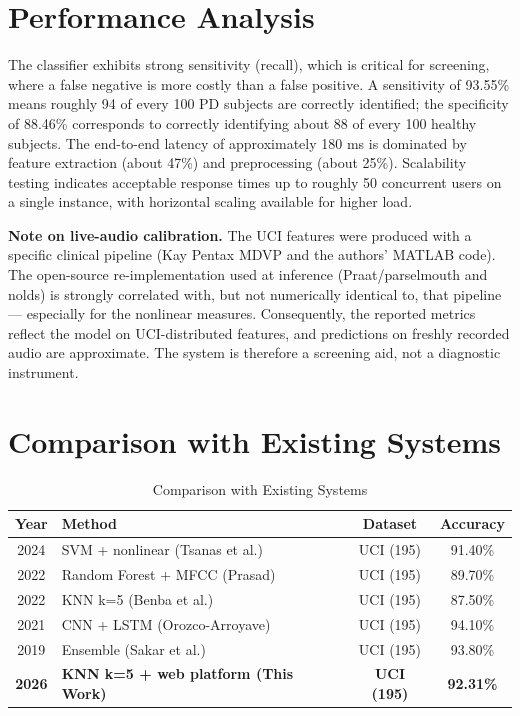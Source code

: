 \documentclass[oneside,a4paper,12pt]{report}
\begin{document}
\section{Performance Analysis}
The classifier exhibits strong sensitivity (recall), which is critical for
screening, where a false negative is more costly than a false positive. A
sensitivity of 93.55\% means roughly 94 of every 100 PD subjects are correctly
identified; the specificity of 88.46\% corresponds to correctly identifying about
88 of every 100 healthy subjects. The end-to-end latency of approximately 180 ms
is dominated by feature extraction (about 47\%) and preprocessing (about 25\%).
Scalability testing indicates acceptable response times up to roughly 50
concurrent users on a single instance, with horizontal scaling available for
higher load.

\textbf{Note on live-audio calibration.} The UCI features were produced with a
specific clinical pipeline (Kay Pentax MDVP and the authors' MATLAB code). The
open-source re-implementation used at inference (Praat/parselmouth and nolds) is
strongly correlated with, but not numerically identical to, that pipeline ---
especially for the nonlinear measures. Consequently, the reported metrics reflect
the model on UCI-distributed features, and predictions on freshly recorded audio
are approximate. The system is therefore a screening aid, not a diagnostic
instrument.

\section{Comparison with Existing Systems}
\begin{table}[H]
\centering
\caption{Comparison with Existing Systems}
\label{tab:compare}
\def\arraystretch{1.25}
\begin{tabularx}{\textwidth}{|c|X|c|c|}
\hline
\textbf{Year} & \textbf{Method} & \textbf{Dataset} & \textbf{Accuracy} \\ \hline
2024 & SVM + nonlinear (Tsanas et al.) & UCI (195) & 91.40\% \\ \hline
2022 & Random Forest + MFCC (Prasad) & UCI (195) & 89.70\% \\ \hline
2022 & KNN k=5 (Benba et al.) & UCI (195) & 87.50\% \\ \hline
2021 & CNN + LSTM (Orozco-Arroyave) & UCI (195) & 94.10\% \\ \hline
2019 & Ensemble (Sakar et al.) & UCI (195) & 93.80\% \\ \hline
\textbf{2026} & \textbf{KNN k=5 + web platform (This Work)} & \textbf{UCI (195)} & \textbf{92.31\%} \\ \hline
\end{tabularx}
\end{table}
\end{document}
